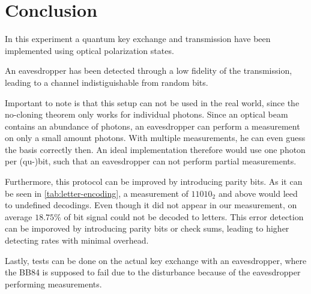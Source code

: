 \section{Conclusion}
\label{sec:conclusion}
In this experiment a quantum key exchange and transmission have been implemented using optical
polarization states.

An eavesdropper has been detected through a low fidelity of the transmission, leading to a channel
indistiguishable from random bits.

Important to note is that this setup can not be used in the real world, since the no-cloning
theorem only works for individual photons. Since an optical beam contains an abundance of photons,
an eavesdropper can perform a measurement on only a small amount photons. With multiple
measurements, he can even guess the basis correctly then. An ideal implementation therefore would
use one photon per (qu-)bit, such that an eavesdropper can not perform partial measurements.

Furthermore, this protocol can be improved by introducing parity bits. As it can be seen in
\autoref{tab:letter-encoding}, a measurement of $11010_2$ and above would leed to undefined
decodings. Even though it did not appear in our measurement, on average $18.75\%$ of bit signal
could not be decoded to letters. This error detection can be imporoved by introducing parity bits or
check sums, leading to higher detecting rates with minimal overhead.

Lastly, tests can be done on the actual key exchange with an eavesdropper, 
where the BB84 is supposed to fail due to the disturbance because of the eavesdropper performing
measurements.

